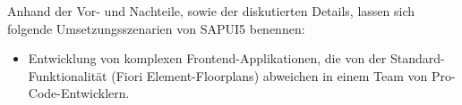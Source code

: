 Anhand der Vor- und Nachteile, sowie der diskutierten Details, lassen sich folgende Umsetzungsszenarien von SAPUI5 benennen:
\begin{itemize}
\item Entwicklung von komplexen Frontend-Applikationen, die von der Standard-Funktionalität (Fiori Element-Floorplans) abweichen in einem Team von Pro-Code-Entwicklern.
\end{itemize}